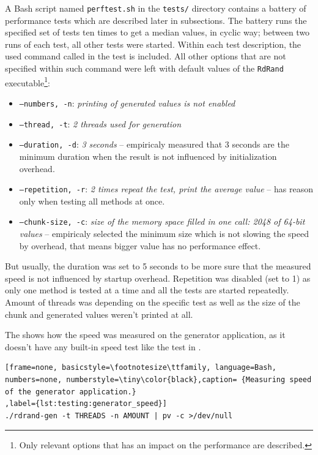 A Bash script named {\tt perftest.sh} in the {\tt tests/} directory contains a battery of performance tests which are described later in subsections. The battery runs the specified set of tests ten times to get a median values, in cyclic way; between two runs of each test, all other tests were started. Within each test description, the used command called in the test is included. All other options that are not specified within such command were left with default values of the {\tt RdRand} executable\footnote{Only relevant options that has an impact on the performance are described.}:

\begin{itemize}
 \item {\tt --numbers, -n}: {\em printing of generated values is not enabled}
 \item {\tt --thread, -t}: {\em 2 threads used for generation}
 \item {\tt --duration, -d}: {\em 3 seconds} -- empiricaly measured that 3 seconds are the minimum duration when the result is not influenced by initialization overhead.
 \item {\tt --repetition, -r}: {\em 2 times repeat the test, print the average value} -- has reason only when testing all methods at once.
 \item {\tt --chunk-size, -c}: {\em size of the memory space filled in one call: 2048 of 64-bit values} -- empiricaly selected the minimum size which is not slowing the speed by overhead, that means bigger value has no performance effect.
\end{itemize}

But usually, the duration was set to 5 seconds to be more sure that the measured speed is not influenced by startup overhead. Repetition was disabled (set to 1) as only one method is tested at a time and all the tests are started repeatedly. Amount of threads was depending on the specific test as well as the size of the chunk and generated values weren't printed at all.

The  shows how the speed was measured on the generator application, as it doesn't have any built-in speed test like the test in .

\begin{lstlisting}[frame=none, basicstyle=\footnotesize\ttfamily, language=Bash, numbers=none, numberstyle=\tiny\color{black},caption= {Measuring speed of the generator application.}
,label={lst:testing:generator_speed}]
./rdrand-gen -t THREADS -n AMOUNT | pv -c >/dev/null
\end{lstlisting}

